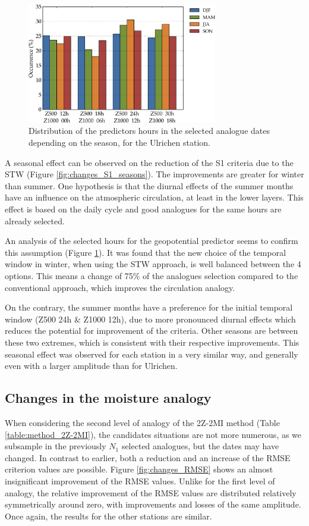 \documentclass[hess]{copernicus}
\begin{document}
\begin{figure}[htb]
	\includegraphics[width=8.3cm]{figures/hours_selection_per_season.pdf}
	\caption{Distribution of the predictors hours in the selected analogue dates depending on the season, for the Ulrichen station.}
	\label{fig:hours_selection_per_season}
\end{figure}

A seasonal effect can be observed on the reduction of the S1 criteria due to the STW (Figure \ref{fig:changes_S1_seasons}). The improvements are greater for winter than summer. One hypothesis is that the diurnal effects of the summer months have an influence on the atmospheric circulation, at least in the lower layers. This effect is based on the daily cycle and good analogues for the same hours are already selected.

An analysis of the selected hours for the geopotential predictor seems to confirm this assumption (Figure \ref{fig:hours_selection_per_season}). It was found that the new choice of the temporal window in winter, when using the STW approach, is well balanced between the 4 options. This means a change of 75\% of the analogues selection compared to the conventional approach, which improves the circulation analogy.

On the contrary, the summer months have a preference for the initial temporal window (Z500 24h \& Z1000 12h), due to more pronounced diurnal effects which reduces the potential for improvement of the criteria. Other seasons are between these two extremes, which is consistent with their respective improvements. This seasonal effect was observed for each station in a very similar way, and generally even with a larger amplitude than for Ulrichen.


\subsection{Changes in the moisture analogy}

When considering the second level of analogy of the 2Z-2MI method (Table \ref{table:method_2Z-2MI}), the candidates situations are not more numerous, as we subsample in the previously $N_{1}$ selected analogues, but the dates may have changed. In contrast to earlier, both a reduction and an increase of the RMSE criterion values are possible. Figure \ref{fig:changes_RMSE} shows an almost insignificant improvement of the RMSE values. Unlike for the first level of analogy, the relative improvement of the RMSE values are distributed relatively symmetrically around zero, with improvements and losses of the same amplitude. Once again, the results for the other stations are similar.
\end{document}
